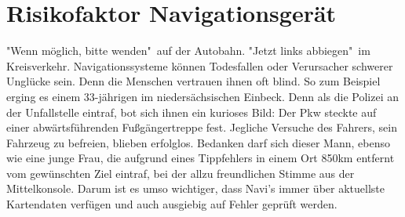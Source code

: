 \documentclass[12pt]{article}
\begin{document}
\renewcommand{\figurename}{Abb.}
\def\figureautorefname{Abb.}
\def\algorithmautorefname{Alg.}


\renewcommand{\algorithmicrequire}{\textbf{geg.:}}
\renewcommand{\algorithmicensure}{\textbf{ges.:}}
\renewcommand{\algorithmicprocedure}{\textbf{prozedur}}
\renewcommand{\algorithmicfor}{\textbf{für}}
\renewcommand{\algorithmicdo}{\textbf{wiederhole}}
\renewcommand{\algorithmicend}{\textbf{ende}}
\renewcommand{\algorithmicrepeat}{\textbf{wiederhole}}
\renewcommand{\algorithmicif}{\textbf{wenn}}
\renewcommand{\algorithmicthen}{\textbf{dann}}
\renewcommand{\algorithmicuntil}{\textbf{solange}} %
\newcommand{\sei}{\textbf{sei }}






\tableofcontents
\thispagestyle{empty}
\clearpage

\section{Risikofaktor Navigationsgerät}
"Wenn möglich, bitte wenden"\ auf der Autobahn. "Jetzt links abbiegen"\ im Kreisverkehr. Navigationssysteme können Todesfallen oder Verursacher schwerer Unglücke sein. Denn die Menschen vertrauen ihnen oft blind. So zum Beispiel erging es einem 33-jährigen im niedersächsischen Einbeck. Denn als die Polizei an der Unfallstelle eintraf, bot sich ihnen ein kurioses Bild: Der Pkw steckte auf einer abwärtsführenden Fußgängertreppe fest. Jegliche Versuche des Fahrers, sein Fahrzeug zu befreien, blieben erfolglos. Bedanken darf sich dieser Mann, ebenso wie eine junge Frau, die aufgrund eines Tippfehlers in einem Ort 850km entfernt vom gewünschten Ziel eintraf, bei der allzu freundlichen Stimme aus der Mittelkonsole.\cite{navi} Darum ist es umso wichtiger, dass Navi's immer über aktuellste Kartendaten verfügen und auch ausgiebig auf Fehler geprüft werden.
\newpage
\end{document}
